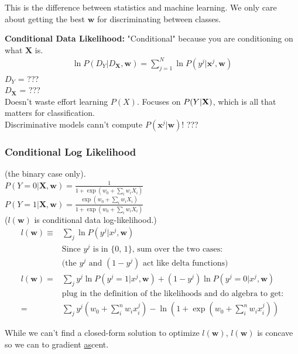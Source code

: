 This is the difference between statistics and machine learning.  We only care about getting the best $\bm{w}$ for discriminating between classes. 

\textbf{Conditional Data Likelihood:} 
"Conditional" because you are conditioning on what $\bm{X}$ is. 
\begin{align*}
	\ln P(D_Y | D_{\bm{X}}, \bm{w}) = \sum_{j=1}^N \ln P(y^j | \bm{x}^j, \bm{w})
\end{align*}
$D_Y$ = ???  \hfill \\
$D_{\bm{X}}$ = ???   \hfill \\
Doesn't waste effort learning $P(X)$.  Focuses on $P(Y| \bf{X})$, which is all that matters for classification. \hfill \\
Discriminative models cann't compute $P(\bm{x}^j | \bm{w})$!  ??? 
\hfill \\

\subsubsection{Conditional Log Likelihood}
(the binary case only).  \hfill \\
$P(Y=0 | \bm{X}, \bm{w}) = \frac{1}{1 + \exp(w_0 + \sum_i w_i X_i)}$  \hfill \\
$P(Y=1 | \bm{X}, \bm{w}) = \frac{\exp(w_0 + \sum_i w_i X_i)}{1 + \exp(w_0 + \sum_i w_i X_i)}$  \hfill \\

($ l( \bm{w} )$ is conditional data log-likelihood.)  
\begin{align*}
	l( \bm{w})  \equiv  &  \sum_j \ln P(y^j | x^j, \bm{w})  \\
	& \mbox{Since $y^j$ is in \{0, 1\}, sum over the two cases: }   \\
	& \mbox{(the $y^j$ and $(1-y^j)$ act like delta functions)}   \\
	l(\bm{w})  =  & \sum_j y^j \ln P(y^j = 1 | x^j, \bm{w}) +(1 - y^j) \ln P(y^j = 0 | x^j, \bm{w})  \\
	& \mbox{plug in the definition of the likelihoods and do algebra to get:}  \\
	=& \sum_j  y^j (w_0 + \sum_i^n w_i x_i^j)  - \ln(1 + \exp(w_0 + \sum_i^n w_i x_i^j)) 
\end{align*}	

While we can't find a closed-form solution to optimize $l(\bm{w})$,  $l(\bm{w})$ is concave so we can to gradient \underline{as}cent. 

